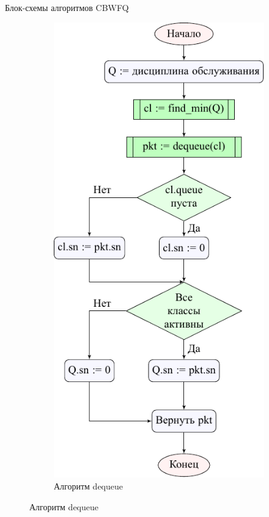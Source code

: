 \documentclass[12pt]{beamer}
\begin{document}
\begin{frame}{Блок-схемы алгоритмов CBWFQ}
\begin{figure}[t]
\begin{subfigure}[b]{0.4\textwidth}
            \center%
            \includegraphics[scale=0.5,frame]{../text/pdfimages/deq_algo.pdf}%
    		\caption*{Алгоритм dequeue}
		\end{subfigure}
	\end{figure}	
\end{frame}
\end{document}
